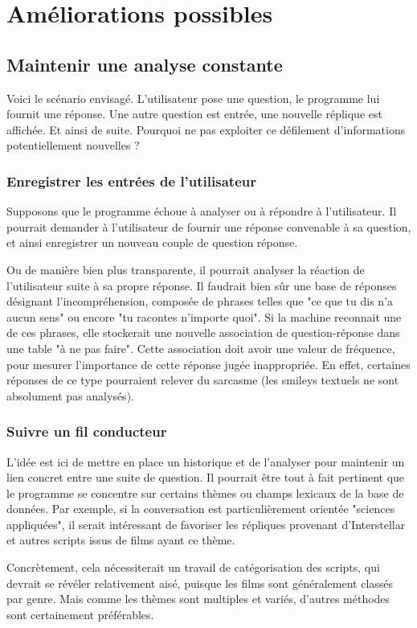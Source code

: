 \newpage
\section{Améliorations possibles}
\subsection{Maintenir une analyse constante}
Voici le scénario envisagé. L'utilisateur pose une question, le programme lui fournit une réponse. Une autre question est entrée, une nouvelle réplique est affichée. Et ainsi de suite. Pourquoi ne pas exploiter ce défilement d'informations potentiellement nouvelles ?
\subsubsection{Enregistrer les entrées de l'utilisateur}
	Supposons que le programme échoue à analyser ou à répondre à l'utilisateur. Il pourrait demander à l'utilisateur de fournir une réponse convenable à sa question, et ainsi enregistrer un nouveau couple de question réponse.

	Ou de manière bien plus transparente, il pourrait analyser la réaction de l'utilisateur suite à sa propre réponse. Il faudrait bien sûr une base de réponses désignant l'incompréhension, composée de phrases telles que "ce que tu dis n'a aucun sens" ou encore "tu racontes n'importe quoi". Si la machine reconnait une de ces phrases, elle stockerait une nouvelle association de question-réponse dans une table "à ne pas faire". Cette association doit avoir une valeur de fréquence, pour mesurer l'importance de cette réponse jugée inappropriée. En effet, certaines réponses de ce type pourraient relever du sarcasme (les smileys textuels ne sont absolument pas analysés).
\subsubsection{Suivre un fil conducteur}
	L'idée est ici de mettre en place un historique et de l'analyser pour maintenir un lien concret entre une suite de question. Il pourrait être tout à fait pertinent que le programme se concentre sur certains thèmes ou champs lexicaux de la base de données.
	Par exemple, si la conversation est particulièrement orientée "sciences appliquées", il serait intéressant de favoriser les répliques provenant d'Interstellar et autres scripts issus de films ayant ce thème.

	Concrètement, cela nécessiterait un travail de catégorisation des scripts, qui devrait se révéler relativement aisé, puisque les films sont généralement classés par genre. Mais comme les thèmes sont multiples et variés, d'autres méthodes sont certainement préférables.

